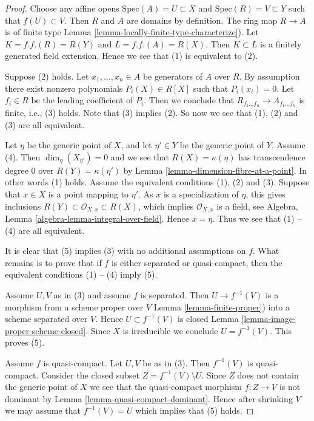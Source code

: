 \begin{proof}
Choose any affine opens $\text{Spec}(A) = U \subset X$
and $\text{Spec}(R) = V \subset Y$ such that $f(U) \subset V$.
Then $R$ and $A$ are domains by definition. The ring map
$R \to A$ is of finite type
Lemma \ref{lemma-locally-finite-type-characterize}).
Let $K = f.f.(R) = R(Y)$ and $L = f.f.(A) = R(X)$. Then $K \subset L$
is a finitely generated field extension. Hence we see that
(1) is equivalent to (2).

\medskip\noindent
Suppose (2) holds. Let $x_1, \ldots, x_n \in A$ be generators
of $A$ over $R$. By assumption there exist nonzero polynomials
$P_i(X) \in R[X]$ such that $P_i(x_i) = 0$. Let $f_i \in R$ be the
leading coefficient of $P_i$. Then we conclude that
$R_{f_1 \ldots f_n} \to A_{f_1 \ldots f_n}$ is finite, i.e., (3) holds.
Note that (3) implies (2). So now we see that (1), (2) and (3) are all
equivalent.

\medskip\noindent
Let $\eta$ be the generic point of $X$, and let $\eta' \in Y$ be the
generic point of $Y$. Assume (4). Then
$\dim_\eta(X_{\eta'}) = 0$ and we see that $R(X) = \kappa(\eta)$ has
transcendence degree $0$ over $R(Y) = \kappa(\eta')$ by
Lemma \ref{lemma-dimension-fibre-at-a-point}.
In other words (1) holds. Assume the equivalent conditions (1), (2) and
(3). Suppose that $x \in X$ is a point mapping to $\eta'$.
As $x$ is a specialization of $\eta$,
this gives inclusions $R(Y) \subset \mathcal{O}_{X, x} \subset R(X)$,
which implies $\mathcal{O}_{X, x}$ is a field, see
Algebra, Lemma \ref{algebra-lemma-integral-over-field}.
Hence $x = \eta$. Thus we see that (1) -- (4)
are all equivalent.

\medskip\noindent
It is clear that (5) implies (3) with no additional assumptions on
$f$. What remains is to prove that if $f$ is either separated or
quasi-compact, then the equivalent conditions (1) -- (4) imply (5).

\medskip\noindent
Assume $U, V$ as in (3) and assume $f$ is separated.
Then $U \to f^{-1}(V)$ is a morphism from a scheme proper over $V$
Lemma \ref{lemma-finite-proper})
into a scheme separated over $V$.
Hence $U \subset f^{-1}(V)$ is closed
Lemma \ref{lemma-image-proper-scheme-closed}.
Since $X$ is irreducible we conclude $U = f^{-1}(V)$. This
proves (5).

\medskip\noindent
Assume $f$ is quasi-compact. Let $U, V$ be as in (3).
Then $f^{-1}(V)$ is quasi-compact. Consider the closed subset
$Z = f^{-1}(V) \setminus U$. Since $Z$ does not contain the
generic point of $X$ we see that the quasi-compact morphism
$f : Z \to V$ is not dominant by
Lemma \ref{lemma-quasi-compact-dominant}.
Hence after shrinking $V$ we may assume that $f^{-1}(V) = U$
which implies that (5) holds.
\end{proof}

